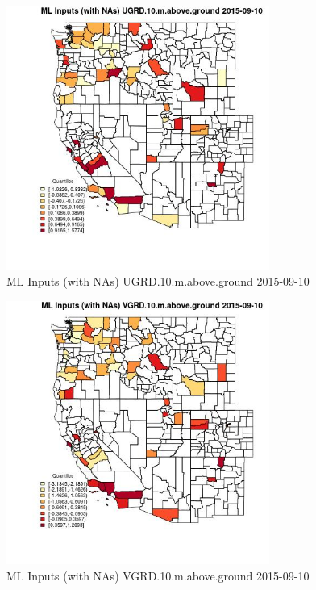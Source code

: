 \begin{figure} 
\centering  
\includegraphics[width=0.77\textwidth]{Code_Outputs/Report_ML_input_PM25_Step4_part_e_de_duplicated_aveswNAs_CountyUGRD10mabovegroundMean2015-09-10_2015-09-10.jpg} 
\caption{\label{fig:Report_ML_input_PM25_Step4_part_e_de_duplicated_aveswNAsCountyUGRD10mabovegroundMean2015-09-10_2015-09-10}ML Inputs (with NAs) UGRD.10.m.above.ground 2015-09-10} 
\end{figure} 
 

\begin{figure} 
\centering  
\includegraphics[width=0.77\textwidth]{Code_Outputs/Report_ML_input_PM25_Step4_part_e_de_duplicated_aveswNAs_CountyVGRD10mabovegroundMean2015-09-10_2015-09-10.jpg} 
\caption{\label{fig:Report_ML_input_PM25_Step4_part_e_de_duplicated_aveswNAsCountyVGRD10mabovegroundMean2015-09-10_2015-09-10}ML Inputs (with NAs) VGRD.10.m.above.ground 2015-09-10} 
\end{figure} 
 

